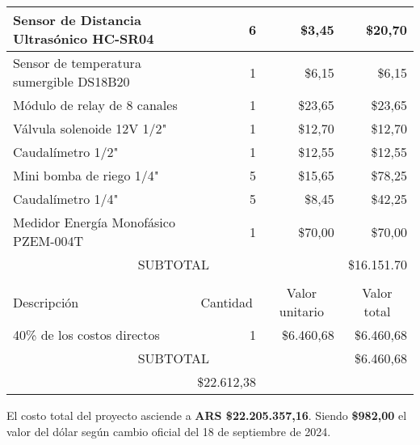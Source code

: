 \begin{table}[htpb]
\begin{tabularx}{\linewidth}{@{}|X|c|r|r|@{}}
		Sensor de Distancia Ultrasónico HC-SR04  & 
		\multicolumn{1}{r|}{6} & \multicolumn{1}{r|}{\$3,45} & \multicolumn{1}{r|}{\$20,70} \\ \hline
		Sensor de temperatura sumergible DS18B20  & 
		\multicolumn{1}{r|}{1} & \multicolumn{1}{r|}{\$6,15} & \multicolumn{1}{r|}{\$6,15} \\ \hline
		Módulo de relay de 8 canales  & 
		\multicolumn{1}{r|}{1} & \multicolumn{1}{r|}{\$23,65} & \multicolumn{1}{r|}{\$23,65} \\ \hline
		Válvula solenoide 12V 1/2"  & 
		\multicolumn{1}{r|}{1} & \multicolumn{1}{r|}{\$12,70} & \multicolumn{1}{r|}{\$12,70} \\ \hline
		Caudalímetro 1/2"  & 
		\multicolumn{1}{r|}{1} & \multicolumn{1}{r|}{\$12,55} & \multicolumn{1}{r|}{\$12,55} \\ \hline
		Mini bomba de riego 1/4"  & 
		\multicolumn{1}{r|}{5} & \multicolumn{1}{r|}{\$15,65} & \multicolumn{1}{r|}{\$78,25} \\ \hline
		Caudalímetro 1/4"  & 
		\multicolumn{1}{r|}{5} & \multicolumn{1}{r|}{\$8,45} & \multicolumn{1}{r|}{\$42,25} \\ \hline
		Medidor Energía Monofásico PZEM-004T  & 
		\multicolumn{1}{r|}{1} & \multicolumn{1}{r|}{\$70,00} & \multicolumn{1}{r|}{\$70,00} \\ \hline
		
		\multicolumn{3}{|c|}{SUBTOTAL} & \multicolumn{1}{r|}{\$16.151.70} \\ \hline
		\rowcolor[HTML]{C0C0C0}
		\multicolumn{4}{|c|}{\cellcolor[HTML]{C0C0C0}COSTOS INDIRECTOS} \\ \hline
		\rowcolor[HTML]{C0C0C0}
		Descripción                                                 &
		\multicolumn{1}{c|}{\cellcolor[HTML]{C0C0C0}Cantidad}       &
		\multicolumn{1}{c|}{\cellcolor[HTML]{C0C0C0}Valor unitario} &
		\multicolumn{1}{c|}{\cellcolor[HTML]{C0C0C0}Valor total}        \\ \hline
		40\% de los costos directos   & 
		\multicolumn{1}{r|}{1} & \multicolumn{1}{r|}{\$6.460,68} & \multicolumn{1}{r|}{\$6.460,68} \\ \hline
		
		\multicolumn{3}{|c|}{SUBTOTAL}                              &
		\multicolumn{1}{r|}{\$6.460,68}                                           \\ \hline
		\rowcolor[HTML]{C0C0C0}
		\multicolumn{3}{|c|}{TOTAL}                                 & \$22.612,38
		\\ \hline
	\end{tabularx}%
\end{table}

\vspace{5mm}
El costo total del proyecto asciende a \textbf{ARS \$22.205.357,16}. Siendo \textbf{\$982,00} el valor del dólar según cambio oficial del 18 de septiembre de 2024.